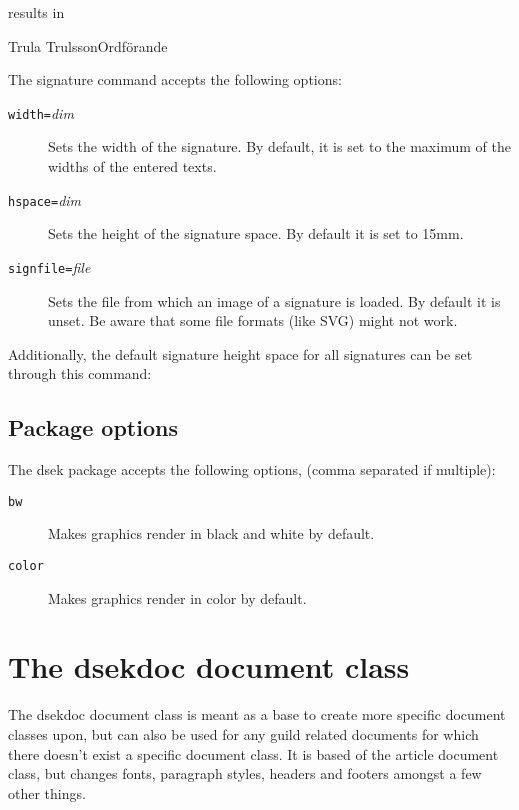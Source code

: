 \documentclass[a4paper, oneside]{ltxdoc}
\begin{document}
results in

\begin{center}
  \signature{Lund, dag som ovan}{Trula Trulsson}{Ordförande}
\end{center}

The signature command accepts the following options:
\begin{description}
  \item[\texttt{width=}\textlangle\textit{dim}\textrangle] Sets the width of the
        signature.  By default, it is set to the maximum of the widths of the
        entered texts.
  \item[\texttt{hspace=}\textlangle\textit{dim}\textrangle] Sets the height of
        the signature space.  By default it is set to 15mm.
  \item[\texttt{signfile=}\textlangle\textit{file}\textrangle]
    Sets the file from which an image of a signature is loaded. By default it is
    unset.  Be aware that some file formats (like SVG) might not work.
\end{description}

Additionally, the default signature height space for all signatures can be set
through this command:
\begin{center}
\end{center}

\subsection{Package options}
The \textsf{dsek} package accepts the following options, (comma separated if
multiple):

\begin{description}
  \item[\texttt{bw}] Makes graphics render in black and white by default.
  \item[\texttt{color}] Makes graphics render in color by default.
\end{description}

\section{The \textsf{dsekdoc} document class}
The \textsf{dsekdoc} document class is meant as a base to create more specific
document classes upon, but can also be used for any guild related documents for
which there doesn't exist a specific document class.  It is based of the
\textsf{article} document class, but changes fonts, paragraph styles, headers
and footers amongst a few other things.
\end{document}
